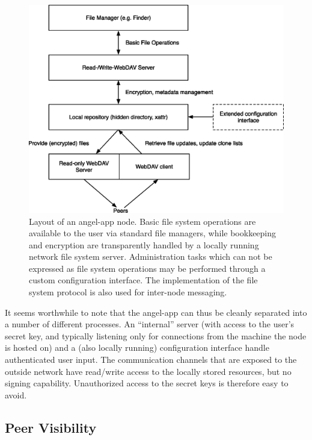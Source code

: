 \documentclass[11pt]{article}
\begin{document}
\begin{mainmatter}
\begin{figure}[ht!]
\begin{center}
\includegraphics[scale=0.7]{figures/eps/webdav.eps}
\end{center}
\caption{Layout of an angel-app node. Basic file system operations are available to the user via standard file managers, while bookkeeping and encryption are transparently handled by a locally running network file system server. Administration tasks which can not be expressed as file system operations may be performed through a custom configuration interface. The implementation of the file system protocol is also used for inter-node messaging.}
\label{webdav}
\end{figure}

It seems worthwhile to note that the angel-app can thus be cleanly separated into a number of different processes. An ``internal'' server (with access to the user's secret key, and typically listening only for connections from the machine the node is hosted on) and a (also locally running) configuration interface handle authenticated user input. The communication channels that are exposed to the outside network have read/write access to the locally stored resources, but no signing capability. Unauthorized access to the secret keys is therefore easy to avoid.

\subsection{Peer Visibility}


\end{mainmatter}
\end{document}
